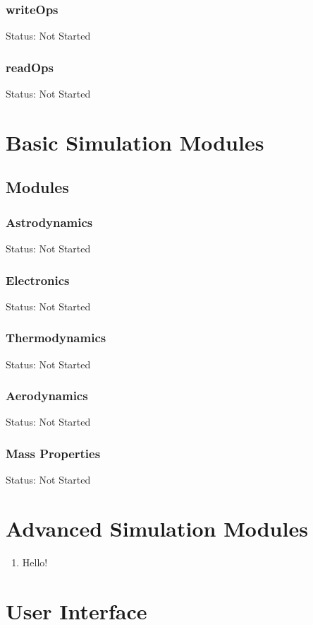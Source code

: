 \documentclass{article}
\begin{document}
			\subsubsection{writeOps}
				Status: Not Started
			\subsubsection{readOps}
				Status: Not Started	

	\section{Basic Simulation Modules}
		\subsection{Modules}
			\subsubsection{Astrodynamics}
				Status: Not Started
			\subsubsection{Electronics}
				Status: Not Started
			\subsubsection{Thermodynamics}
				Status: Not Started
			\subsubsection{Aerodynamics}
				Status: Not Started
			\subsubsection{Mass Properties}
				Status: Not Started
			
	\section{Advanced Simulation Modules}

\begin{enumerate}
	\item Hello!
\end{enumerate}	

	\section{User Interface}
\end{document}
